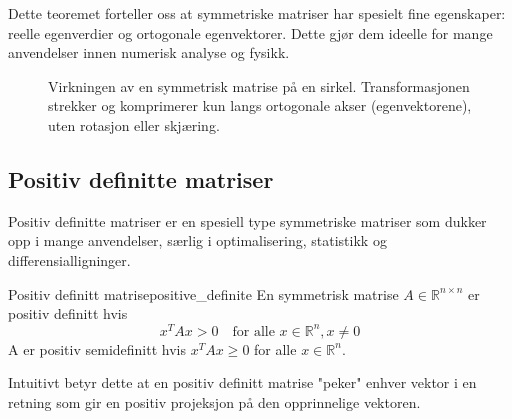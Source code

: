 Dette teoremet forteller oss at symmetriske matriser har spesielt fine egenskaper: reelle egenverdier og ortogonale egenvektorer. Dette gjør dem ideelle for mange anvendelser innen numerisk analyse og fysikk.

\begin{figure}
	\centering
	\caption{Virkningen av en symmetrisk matrise på en sirkel. Transformasjonen strekker og komprimerer kun langs ortogonale akser (egenvektorene), uten rotasjon eller skjæring.}
	\label{fig:symmetric_action}
\end{figure}

\subsection{Positiv definitte matriser}
Positiv definitte matriser er en spesiell type symmetriske matriser som dukker opp i mange anvendelser, særlig i optimalisering, statistikk og differensialligninger.

\begin{definition}{Positiv definitt matrise}{positive_definite}
	En symmetrisk matrise $A \in \mathbb{R}^{n \times n}$ er positiv definitt hvis
	\[
		x^T A x > 0 \quad \text{for alle } x \in \mathbb{R}^n, x \neq 0
	\]
	A er positiv semidefinitt hvis $x^T A x \geq 0$ for alle $x \in \mathbb{R}^n$.
\end{definition}

Intuitivt betyr dette at en positiv definitt matrise "peker" enhver vektor i en retning som gir en positiv projeksjon på den opprinnelige vektoren.

